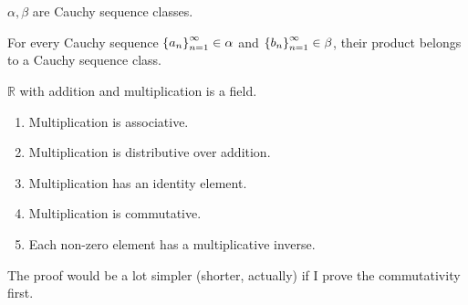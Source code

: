 \begin{corollary}
    $\alpha, \beta$ are Cauchy sequence classes.

    For every Cauchy sequence ${\left\{{a_{n}}\right\}}^{\infty}_{n=1}\in\alpha$ and ${\left\{{b_{n}}\right\}}^{\infty}_{n=1}\in\beta$, their product belongs to a Cauchy sequence class.
\end{corollary}

\begin{theorem}
    $\mathbb{R}$ with addition and multiplication is a field.
    \begin{enumerate}[label={(F\arabic*)},itemsep=0pt,topsep=0pt,start=5]
        \item Multiplication is associative.
        \item Multiplication is distributive over addition.
        \item Multiplication has an identity element.
        \item Multiplication is commutative.
        \item Each non-zero element has a multiplicative inverse.
    \end{enumerate}
\end{theorem}

The proof would be a lot simpler (shorter, actually) if I prove the commutativity first.


